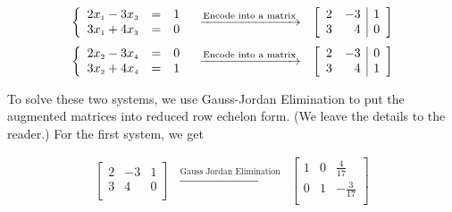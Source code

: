 \[ \begin{array}{ccc}

\left\{ \begin{array}{rcr} 2x_{\mbox{\tiny$1$}}-3x_{\mbox{\tiny$3$}} & = & 1 \\ 3x_{\mbox{\tiny$1$}}+4x_{\mbox{\tiny$3$}} & = & 0 \\ \end{array} \right.

&
\xrightarrow{\text{Encode into a matrix}}

&
\left[ \begin{array}{rr|r} 2 & -3 & 1 \\ 3 & 4 & 0 \\ \end{array} \right] \\ [13pt]


\left\{ \begin{array}{rcr} 2x_{\mbox{\tiny$2$}}-3x_{\mbox{\tiny$4$}} & = & 0 \\ 3x_{\mbox{\tiny$2$}}+4x_{\mbox{\tiny$4$}} & = & 1 \\ \end{array} \right. 

&
\xrightarrow{\text{Encode into a matrix}}

&

\left[ \begin{array}{rr|r} 2 & -3 & 0 \\ 3 & 4 & 1 \\ \end{array} \right] \\

\end{array} \]

To solve these two systems, we use Gauss-Jordan Elimination to put the augmented matrices into reduced row echelon form. (We leave the details to the reader.) For the first system, we get 

\[ \begin{array}{ccc}

\left[ \begin{array}{rr|r} 2 & -3 & 1 \\ 3 & 4 & 0 \\ \end{array} \right] 
&
\xrightarrow{\text{Gauss Jordan Elimination}}

&
\left[ \begin{array}{rr|r} 1 & 0 & \frac{4}{17} \\[3pt] 0 & 1 & -\frac{3}{17} \\ \end{array} \right] \\

\end{array}\]

